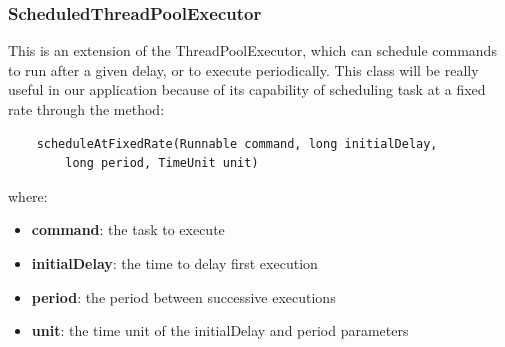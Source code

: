 \subsubsection{ScheduledThreadPoolExecutor}
This is an extension of the ThreadPoolExecutor, which can schedule commands to run after a given delay, or to execute periodically. This class will be really useful in our application because of its capability of scheduling task at a fixed rate through the method:
\begin{lstlisting}
	scheduleAtFixedRate(Runnable command, long initialDelay,
		long period, TimeUnit unit)
\end{lstlisting}
where:
\begin{itemize}
	\item \textbf{command}: the task to execute
	\item \textbf{initialDelay}: the time to delay first execution
	\item \textbf{period}: the period between successive executions
	\item \textbf{unit}: the time unit of the initialDelay and period parameters
\end{itemize}


